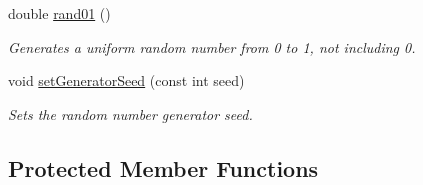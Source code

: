 \begin{DoxyCompactItemize}
double \hyperlink{class_simulation_a938de951b2766c6fb2b00cf9714caffa}{rand01} ()
\begin{DoxyCompactList}\small\item\em Generates a uniform random number from 0 to 1, not including 0. \end{DoxyCompactList}\item 
void \hyperlink{class_simulation_a1a825b9da67da43104137662694655bd}{set\+Generator\+Seed} (const int seed)
\begin{DoxyCompactList}\small\item\em Sets the random number generator seed. \end{DoxyCompactList}\end{DoxyCompactItemize}
\subsection*{Protected Member Functions}
